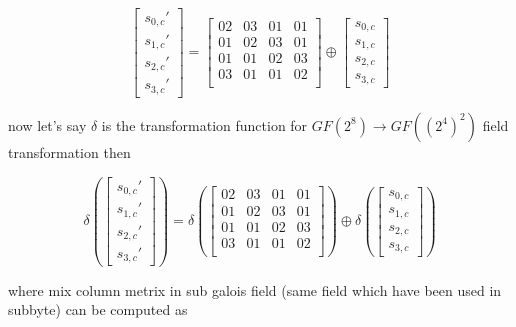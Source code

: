 \documentclass[10pt, conference, compsocconf]{IEEEtran}
\begin{document}
\begin{equation}
\left[ \begin{array}{c}
s_{0,c}' \\s_{1,c}' \\s_{2,c}' \\s_{3,c}' \end{array} \right] =
\left[ \begin{array}{cccccccc}
02 & 03 & 01 & 01\\
01 & 02 & 03 & 01\\
01 & 01 & 02 & 03\\
03 & 01 & 01 & 02\\
 \end{array} \right] \oplus
 \left[ \begin{array}{c}
s_{0,c}\\s_{1,c}\\s_{2,c}\\s_{3,c} \end{array} \right]
\end{equation}

now let's say $\delta$ is the transformation function for $GF(2^8) \rightarrow GF((2^4)^2)$ field transformation then

\begin{equation}
\delta \left(\left[ \begin{array}{c}
s_{0,c}' \\s_{1,c}' \\s_{2,c}' \\s_{3,c}' \end{array} \right]\right) =
\delta \left(\left[ \begin{array}{cccccccc}
02 & 03 & 01 & 01\\
01 & 02 & 03 & 01\\
01 & 01 & 02 & 03\\
03 & 01 & 01 & 02\\
 \end{array} \right]\right) \oplus
 \delta \left(\left[ \begin{array}{c}
s_{0,c}\\s_{1,c}\\s_{2,c}\\s_{3,c} \end{array} \right]\right)
\end{equation}

where mix column metrix in sub galois field (same field which have been used in subbyte) can be computed as
\end{document}
